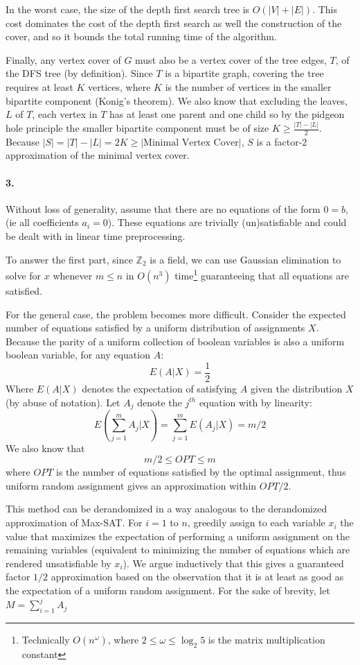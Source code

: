 \documentclass{article}
\begin{document}
In the worst case, the size of the depth first search tree is $O(|V| + |E|)$.  This cost dominates the cost of the depth first search as well the construction of the cover, and so it bounds the total running time of the algorithm.

Finally, any vertex cover of $G$ must also be a vertex cover of the tree edges, $T$, of the DFS tree (by definition).  Since $T$ is a bipartite graph, covering the tree requires at least $K$ vertices, where $K$ is the number of vertices in the smaller bipartite component (Konig's theorem).  We also know that excluding the leaves, $L$ of $T$, each vertex in $T$ has at least one parent and one child so by the pidgeon hole principle the smaller bipartite component must be of size $K \geq \frac{|T| - |L|}{2}$.  Because $|S| = |T| - |L| = 2K \geq |\textrm{Minimal Vertex Cover}|$, $S$ is a factor-2 approximation of the minimal vertex cover.

\paragraph{3.}
Without loss of generality, assume that there are no equations of the form $0 = b$, (ie all coefficients $a_i = 0$).  These equations are trivially (un)satisfiable and could be dealt with in linear time preprocessing.

To answer the first part, since $\mathbb{Z}_2$ is a field, we can use Gaussian elimination to solve for $x$ whenever $m \leq n$ in $O(n^3)$ time\footnote{Technically $O(n^\omega)$, where $2 \leq \omega \leq \log_2 5$ is the matrix multiplication constant} guaranteeing that all equations are satisfied.

For the general case, the problem becomes more difficult.  Consider the expected number of equations satisfied by a uniform distribution of assignments $X$.  Because the parity of a uniform collection of boolean variables is also a uniform boolean variable, for any equation $A$:
\[E(A | X) = \frac{1}{2} \]
Where $E(A|X)$ denotes the expectation of satisfying $A$ given the distribution $X$ (by abuse of notation).  Let $A_j$ denote the $j^{th}$ equation with by linearity:
\[ E(\sum \limits_{j=1}^m A_j | X) = \sum \limits_{j=1}^m E(A_j | X) = m / 2 \]
We also know that 
\[ m/2 \leq OPT \leq m \]
where $OPT$ is the number of equations satisfied by the optimal assignment, thus uniform random assignment gives an approximation within $OPT / 2$.

This method can be derandomized in a way analogous to the derandomized approximation of Max-SAT.  For $i = 1$ to $n$, greedily assign to each variable $x_i$ the value that maximizes the expectation of performing a uniform assignment on the remaining variables (equivalent to minimizing the number of equations which are rendered unsatisfiable by $x_i$).  We argue inductively that this gives a guaranteed factor $1/2$ approximation based on the observation that it is at least as good as the expectation of a uniform random assignment.  For the sake of brevity, let $M = \sum \limits_{i=1}^j A_j$
\end{document}
